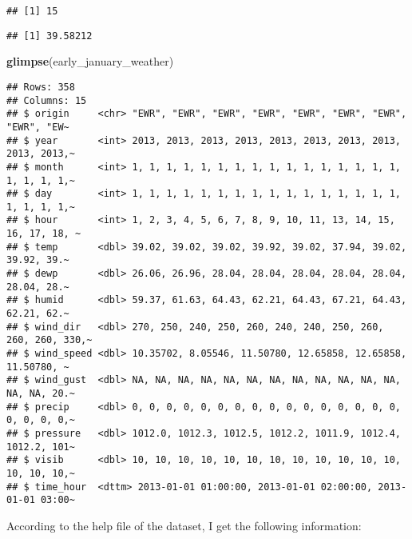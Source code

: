 \documentclass[
]{article}
\newenvironment{Shaded}{\begin{snugshade}}{\end{snugshade}}
\newcommand{\AttributeTok}[1]{\textcolor[rgb]{0.13,0.29,0.53}{#1}}
\newcommand{\ConstantTok}[1]{\textcolor[rgb]{0.56,0.35,0.01}{#1}}
\newcommand{\FunctionTok}[1]{\textcolor[rgb]{0.13,0.29,0.53}{\textbf{#1}}}
\newcommand{\NormalTok}[1]{#1}
\newcommand{\SpecialCharTok}[1]{\textcolor[rgb]{0.81,0.36,0.00}{\textbf{#1}}}
\begin{document}
\begin{verbatim}
## [1] 15
\end{verbatim}

\begin{Shaded}
\end{Shaded}

\begin{verbatim}
## [1] 39.58212
\end{verbatim}

\begin{Shaded}
\begin{Highlighting}[]
\FunctionTok{glimpse}\NormalTok{(early\_january\_weather)}
\end{Highlighting}
\end{Shaded}

\begin{verbatim}
## Rows: 358
## Columns: 15
## $ origin     <chr> "EWR", "EWR", "EWR", "EWR", "EWR", "EWR", "EWR", "EWR", "EW~
## $ year       <int> 2013, 2013, 2013, 2013, 2013, 2013, 2013, 2013, 2013, 2013,~
## $ month      <int> 1, 1, 1, 1, 1, 1, 1, 1, 1, 1, 1, 1, 1, 1, 1, 1, 1, 1, 1, 1,~
## $ day        <int> 1, 1, 1, 1, 1, 1, 1, 1, 1, 1, 1, 1, 1, 1, 1, 1, 1, 1, 1, 1,~
## $ hour       <int> 1, 2, 3, 4, 5, 6, 7, 8, 9, 10, 11, 13, 14, 15, 16, 17, 18, ~
## $ temp       <dbl> 39.02, 39.02, 39.02, 39.92, 39.02, 37.94, 39.02, 39.92, 39.~
## $ dewp       <dbl> 26.06, 26.96, 28.04, 28.04, 28.04, 28.04, 28.04, 28.04, 28.~
## $ humid      <dbl> 59.37, 61.63, 64.43, 62.21, 64.43, 67.21, 64.43, 62.21, 62.~
## $ wind_dir   <dbl> 270, 250, 240, 250, 260, 240, 240, 250, 260, 260, 260, 330,~
## $ wind_speed <dbl> 10.35702, 8.05546, 11.50780, 12.65858, 12.65858, 11.50780, ~
## $ wind_gust  <dbl> NA, NA, NA, NA, NA, NA, NA, NA, NA, NA, NA, NA, NA, NA, 20.~
## $ precip     <dbl> 0, 0, 0, 0, 0, 0, 0, 0, 0, 0, 0, 0, 0, 0, 0, 0, 0, 0, 0, 0,~
## $ pressure   <dbl> 1012.0, 1012.3, 1012.5, 1012.2, 1011.9, 1012.4, 1012.2, 101~
## $ visib      <dbl> 10, 10, 10, 10, 10, 10, 10, 10, 10, 10, 10, 10, 10, 10, 10,~
## $ time_hour  <dttm> 2013-01-01 01:00:00, 2013-01-01 02:00:00, 2013-01-01 03:00~
\end{verbatim}

According to the help file of the dataset, I get the following
information:
\end{document}
